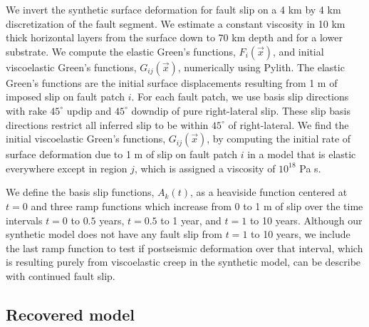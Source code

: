 \documentclass[extra,mreferee]{gji}
\begin{document}
We invert the synthetic surface deformation for fault slip on a 4 km
by 4 km discretization of the fault segment.  We estimate a constant
viscosity in 10 km thick horizontal layers from the surface down to 70
km depth and for a lower substrate. We compute the elastic Green's
functions, $F_i(\vec{x})$, and initial viscoelastic Green's functions,
$G_{ij}(\vec{x})$, numerically using Pylith.  The elastic Green's
functions are the initial surface displacements resulting from 1 m of
imposed slip on fault patch $i$.  For each fault patch, we use basis
slip directions with rake $45^\circ$ updip and $45^\circ$ downdip of
pure right-lateral slip.  These slip basis directions restrict all
inferred slip to be within $45^\circ$ of right-lateral. We find the
initial viscoelastic Green's functions, $G_{ij}(\vec{x})$, by
computing the initial rate of surface deformation due to 1 m of slip
on fault patch $i$ in a model that is elastic everywhere except in
region $j$, which is assigned a viscosity of $10^{18}$ Pa s.

We define the basis slip functions, $A_k(t)$, as a heaviside function
centered at $t=0$ and three ramp functions which increase from 0 to 1
m of slip over the time intervals $t=0$ to $0.5$ years, $t=0.5$ to 1
year, and $t=1$ to 10 years.  Although our synthetic model does not
have any fault slip from $t=1$ to 10 years, we include the last
ramp function to test if postseismic deformation over that interval,
which is resulting purely from viscoelastic creep in the synthetic
model, can be describe with continued fault slip.

\subsection{Recovered model}
\end{document}
